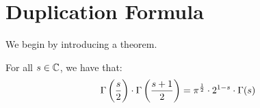 \setcounter{section}{0}
\setcounter{theorem}{0}


\section{Duplication Formula}

We begin by introducing a theorem.
\begin{theorem}
For all $s \in \mathbb{C}$, we have that:
\begin{align*}
    \Gamma\left( \frac{s}{2} \right) \cdot \Gamma\left( \frac{s+1}{2} \right) = \pi ^{\frac{1}{2}} \cdot 2^{1-s} \cdot \Gamma(s)
\end{align*}
\end{theorem}

